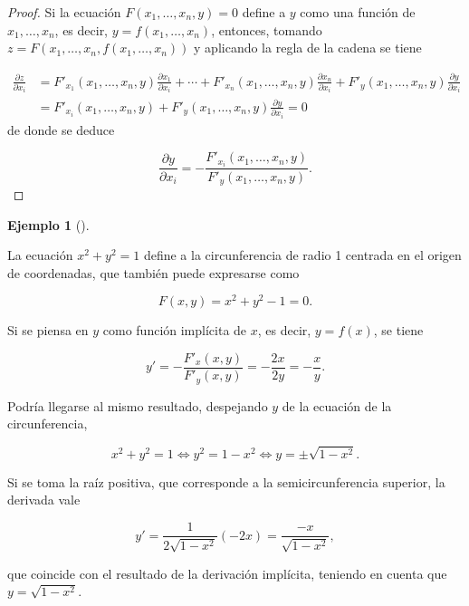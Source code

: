 \documentclass[
  a4paper,
]{scrreport}
\theoremstyle{definition}
\theoremstyle{plain}
\theoremstyle{plain}
\theoremstyle{definition}
\theoremstyle{definition}
\newtheorem{example}{Ejemplo}[chapter]
\theoremstyle{plain}
\theoremstyle{remark}
\begin{document}
\begin{tcolorbox}[enhanced jigsaw, breakable, title=\textcolor{quarto-callout-note-color}{\faInfo}\hspace{0.5em}{Demostración}, toprule=.15mm, coltitle=black, arc=.35mm, rightrule=.15mm, colframe=quarto-callout-note-color-frame, colbacktitle=quarto-callout-note-color!10!white, toptitle=1mm, titlerule=0mm, leftrule=.75mm, opacityback=0, colback=white, bottomrule=.15mm, bottomtitle=1mm, left=2mm, opacitybacktitle=0.6]

\begin{proof}

Si la ecuación \(F(x_1,\ldots,x_n,y)=0\) define a \(y\) como una función
de \(x_1, \ldots, x_n\), es decir, \(y=f(x_1,\ldots,x_n)\), entonces,
tomando \(z=F(x_1,\ldots,x_n,f(x_1,\ldots,x_n))\) y aplicando la regla
de la cadena se tiene

\begin{align*}
\frac{\partial z}{\partial x_i} 
&= F'_{x_1}(x_1,\ldots,x_n,y)\frac{\partial x_1}{\partial x_i} + \cdots + F'_{x_n}(x_1,\ldots,x_n,y)\frac{\partial x_n}{\partial x_i} + F'_{y}(x_1,\ldots,x_n,y)\frac{\partial y}{\partial x_i} \\
&= F'_{x_i}(x_1,\ldots,x_n,y) + F'_{y}(x_1,\ldots,x_n,y)\frac{\partial y}{\partial x_i} = 0
\end{align*} de donde se deduce

\[
\frac{\partial y}{\partial x_i} = -\frac{F'_{x_i}(x_1,\ldots,x_n,y)}{F'_{y}(x_1,\ldots,x_n,y)}.
\]

\end{proof}

\end{tcolorbox}

\begin{example}[]\protect\hypertarget{exm-derivada-implicita}{}\label{exm-derivada-implicita}

La ecuación \(x^2+y^2=1\) define a la circunferencia de radio 1 centrada
en el origen de coordenadas, que también puede expresarse como

\[
F(x,y) = x^2+y^2-1 = 0.
\]

Si se piensa en \(y\) como función implícita de \(x\), es decir,
\(y=f(x)\), se tiene

\[
y'=-\frac{F'_x(x,y)}{F'_y(x,y)} = -\frac{2x}{2y}=-\frac{x}{y}.
\]

Podría llegarse al mismo resultado, despejando \(y\) de la ecuación de
la circunferencia,

\[
x^2+y^2=1 \Leftrightarrow y^2=1-x^2 \Leftrightarrow y= \pm\sqrt{1-x^2}.
\]

Si se toma la raíz positiva, que corresponde a la semicircunferencia
superior, la derivada vale

\[
y' = \frac{1}{2\sqrt{1-x^2}}(-2x) = \frac{-x}{\sqrt{1-x^2}},
\]

que coincide con el resultado de la derivación implícita, teniendo en
cuenta que \(y=\sqrt{1-x^2}\).

\end{example}
\end{document}
